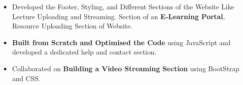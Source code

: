 \documentclass[10pt,a4paper,ragged2e]{altacv}
\begin{document}
\begin{itemize}
\item  Developed the Footer, Styling, and Different Sections of the Website Like Lecture Uploading and Streaming.
Section of an \textbf{E-Learning Portal}, Resource Uploading Section of Website.
\smallskip
\item \textbf{Built from Scratch and Optimised the Code} using JavaScript and developed a dedicated help and contact section.
\smallskip
\item Collaborated on \textbf{Building a Video Streaming Section} using BootStrap and CSS.
\end{itemize}
\\

\end{document}

